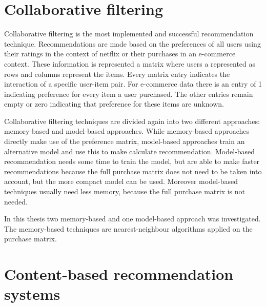 \documentclass[10pt]{reportMaster}
\begin{document}
\section{Collaborative filtering}
\label{rs_cf}
Collaborative filtering is the most implemented and successful recommendation technique. %
Recommendations are made based on the preferences of all users using their ratings in the context of netflix or their purchases in an e-commerce context.
These information is represented a matrix where users a represented as rows and columns represent the items.
Every matrix entry indicates the interaction of a specific user-item pair.
For e-commerce data there is an entry of 1 indicating preference for every item a user purchased.
The other entries remain empty or zero indicating that preference for these items are unknown. %

Collaborative filtering techniques are divided again into two different approaches: memory-based and model-based approaches.
While memory-based approaches directly make use of the preference matrix, model-based approaches train an alternative model and use this to make calculate recommendation.
Model-based recommendation needs some time to train the model, but are able to make faster recommendations because the full purchase matrix does not need to be taken into account, but the more compact model can be used.
Moreover model-based techniques usually need less memory, because the full purchase matrix is not needed.

In this thesis two memory-based and one model-based approach was investigated.
The memory-based techniques are nearest-neighbour algorithms applied on the purchase matrix.



\section{Content-based recommendation systems} %
\label{rs_cb}
 
\end{document}
